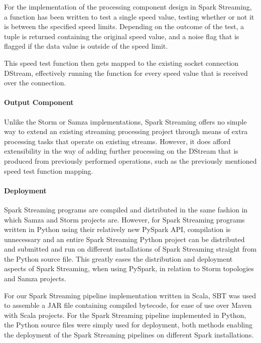For the implementation of the processing component design in Spark Streaming, a function has been written to test a single
speed value, testing whether or not it is between the specified speed limits. Depending on the outcome of the test,
a tuple is returned containing the original speed value, and a noise flag that is flagged if the data value is outside
of the speed limit.

This speed test function then gets mapped to the existing socket connection DStream, effectively running the function
for every speed value that is received over the connection.

\paragraph{Output Component}

Unlike the Storm or Samza implementations, Spark Streaming offers no simple way to extend an existing streaming processing
project through means of extra processing tasks that operate on existing streams. However, it does afford extensibility
in the way of adding further processing on the DStream that is produced from previously performed operations, such
as the previously mentioned speed test function mapping.

\paragraph{Deployment}

Spark Streaming programs are compiled and distributed in the same fashion in which Samza and Storm projects are. However,
for Spark Streaming programs written in Python using their relatively new PySpark API, compilation is unnecessary and an entire Spark
Streaming Python project can be distributed and submitted and run on different installations of Spark Streaming straight
from the Python source file. This greatly eases the distribution and deployment aspects of Spark Streaming, when using
PySpark, in relation to Storm topologies and Samza projects.

For our Spark Streaming pipeline implementation written in Scala, SBT was used to assemble a JAR file containing compiled
bytecode, for ease of use over Maven with Scala projects. For the Spark Streaming pipeline implemented in Python, the
Python source files were simply used for deployment, both methods enabling the deployment of the Spark Streaming pipelines on
different Spark installations.





